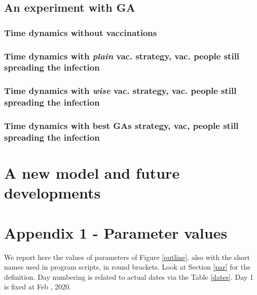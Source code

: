 \documentclass[graybox]{svmult}
\begin{document}
\subsection{An experiment with GA}

\subsubsection{Time dynamics without vaccinations}

\subsubsection{Time dynamics with \emph{plain} vac. strategy, vac. people still spreading the infection}

\subsubsection{Time dynamics with \emph{wise} vac. strategy, vac. people still spreading the infection}

\subsubsection{Time dynamics with best GAs strategy, vac, people still spreading the infection}


\section{A new model and future developments}

\section{Appendix 1 - Parameter values}
\label{app1}

We report here the values of parameters of Figure \ref{outline}, also with the short names used in program scripts, in round brackets. Look at Section \ref{par} for the definition. Day numbering is related to actual dates via the Table \ref{dates}. Day 1 is fixed at Feb , 2020.
\end{document}
